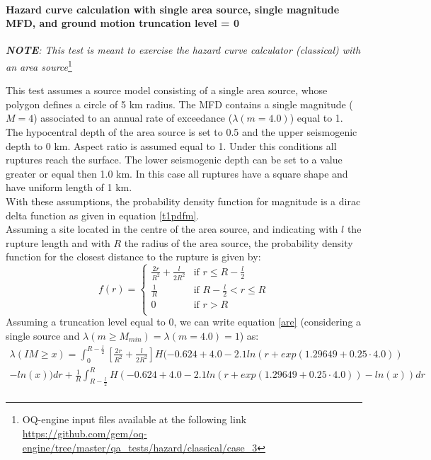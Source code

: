 \paragraph{Hazard curve calculation with single area source, single
magnitude MFD, and ground motion truncation level = 0} 
%
\textit{\textbf{NOTE}: This test is meant to exercise the hazard curve 
    calculator (classical) with an area source}\footnote{
    OQ-engine input files available at the following link
    \url{https://github.com/gem/oq-engine/tree/master/qa_tests/hazard/classical/case_3}}
 
This test assumes a source model consisting of a single area source, whose
polygon defines a circle of 5 km radius. The MFD contains a single magnitude
($M=4$) associated to an annual rate of exceedance ($\lambda(m=4.0)$) equal to
1. The hypocentral depth of the area source is set to 0.5 and the upper
seismogenic depth to 0 km. Aspect ratio is assumed equal to 1. Under this
conditions all ruptures reach the surface. The lower seismogenic depth can be
set to a value greater or equal then 1.0 km. In this case all ruptures have a
square shape and have uniform length of 1 km.\\ With these assumptions, the
probability density function for magnitude is a dirac delta function as given in
equation \ref{t1pdfm}.\\ Assuming a site located in the centre of the area
source, and indicating with $l$ the rupture length and with $R$ the radius of
the area source, the probability density function for the closest distance to
the rupture is given by:
\begin{equation}
f(r) = 
\begin{cases}
\frac{2r}{R^{2}} + \frac{l}{2R^{2}} & \text{if } r \leq R - \frac{l}{2} \\
\frac{1}{R}         & \text{if } R - \frac{l}{2} < r \leq R \\
0                         &   \text{if } r > R \\
\end{cases}
\end{equation}
Assuming a truncation level equal to 0, we can write equation \ref{are} (considering a single source and $\lambda(m\geq M_{min}) = \lambda(m=4.0) = 1$) as:
\begin{eqnarray}
    \label{aret3}
    \lambda(IM \geq x) = \int_{0}^{R-\frac{l}{2}}\left[\frac{2r}{R^{2}} +
    \frac{l}{2R^{2}}\right] H(-0.624 + 4.0 - 2.1 ln(r + exp(1.29649 + 0.25 \cdot
    4.0)) \nonumber \\
    - ln(x))dr + \frac{1}{R}\int_{R - \frac{l}{2}}^{R}H(-0.624 + 4.0 - 2.1 ln(r
    + exp(1.29649 + 0.25 \cdot 4.0)) - ln(x))dr \nonumber \\
\end{eqnarray}
